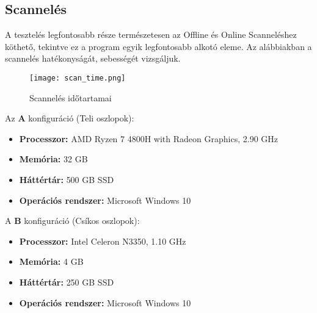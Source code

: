 \subsection{Scannelés}
A tesztelés legfontosabb része természetesen az Offline és Online Scanneléshez köthető, tekintve ez a program egyik legfontosabb alkotó eleme. Az alábbiakban a scannelés hatékonyságát, sebességét vizsgáljuk.

\begin{figure}[H]
	\centering
	\texttt{[image: scan\_time.png]}
	\caption{Scannelés időtartamai}
	\label{fig:scan_time}
\end{figure}

{\noindent Az {\textbf A konfiguráció} (Teli oszlopok):}
\begin{itemize}
    \item {\textbf {Processzor: }} AMD Ryzen 7 4800H with Radeon Graphics, 2.90 GHz
    \item {\textbf {Memória: }} 32 GB
    \item {\textbf {Háttértár: }} 500 GB SSD
    \item {\textbf {Operációs rendszer: }} Microsoft Windows 10
\end{itemize}
A {\textbf B konfiguráció} (Csíkos oszlopok):
\begin{itemize}
    \item {\textbf {Processzor: }} Intel Celeron N3350, 1.10 GHz
    \item {\textbf {Memória: }} 4 GB
    \item {\textbf {Háttértár: }} 250 GB SSD
    \item {\textbf {Operációs rendszer: }} Microsoft Windows 10
\end{itemize}

